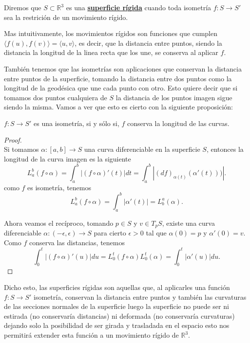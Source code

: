 \begin{definicion}
	Diremos que $S \subset \mathbb{R}^3$ es una \underline{\textbf{superficie rígida}} cuando toda isometría $f : S \to S'$ sea la restrición de un movimiento rígido.
\end{definicion}

Mas intuitivamente, los movimientos rígidos son funciones que cumplen $\langle f(u), f(v) \rangle = \langle u, v \rangle$, es decir, que la distancia entre puntos, siendo la distancia la longitud de la linea recta que los une, se conserva al aplicar $f$.

También tenemos que las isometrías son aplicaciones que conservan la distancia entre puntos de la superficie, tomando la distancia entre dos puntos como la longitud de la geodésica que une cada punto con otro. Esto quiere decir que si tomamos dos puntos cualquiera de $S$ la distancia de los puntos imagen sigue siendo la misma. Vamos a ver que esto es cierto con la siguiente proposición:

\begin{proposicion}
	$f : S \to S'$ es una isometría, si y sólo si, $f$ conserva la longitud de las curvas.
\end{proposicion}

\begin{proof}
	${}$\\
	
	Si tomamos $\alpha : [a,b] \to S$ una curva diferenciable en la superficie $S$, entonces la longitud de la curva imagen es la siguiente
	\[
	L^{b}_{a} (f \circ \alpha) = \int^{b}_{a} |(f \circ \alpha)'(t)| dt = \int^{b}_{a} |(df)_{\alpha(t)}(\alpha'(t)))|.
	\]
	como $f$ es isometría, tenemos
	\[
	L^{b}_{a} (f \circ \alpha) = \int^{b}_{a} |\alpha'(t)| = L^{a}_{b} (\alpha).
	\]
	
	Ahora veamos el recíproco, tomando $p \in S$ y $v \in T_p S$, existe una curva diferenciable $\alpha : (-\epsilon, \epsilon) \to S$ para cierto $\epsilon > 0$ tal que $\alpha(0) = p$ y $\alpha'(0) = v$. Como $f$ conserva las distancias, tenemos
	\[
	\int^{t}_{0}|(f \circ \alpha)'(u)| du = L^{t}_{0} (f \circ \alpha) L^{t}_{0}(\alpha) = \int^{t}_{0} |\alpha'(u)|du.
	\]
	
\end{proof}

Dicho esto, las superficies rígidas son aquellas que, al aplicarles una función $f : S \to S'$ isometría, conservan la distancia entre puntos y también las curvaturas de las secciones normales de la superficie luego la superficie no puede ser ni estirada (no conservaría distancias) ni deformada (no conservaría curvaturas) dejando solo la posibilidad de ser girada y trasladada en el espacio esto nos permitirá extender esta función a un movimiento rígido de $\mathbb{R}^3$.
${ }$\\



